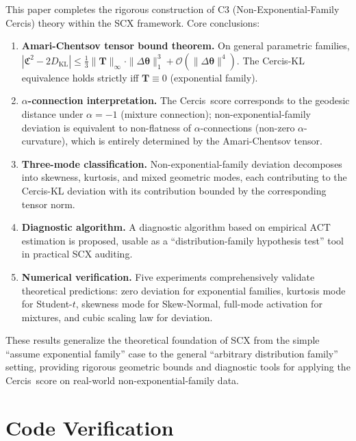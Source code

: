 \documentclass[12pt,a4paper]{article}
\theoremstyle{plain}
\theoremstyle{definition}
\theoremstyle{remark}
\newcommand{\SCX}{\textsf{SCX}}
\newcommand{\Cercis}{\textsf{Cercis}}
\newcommand{\DKL}{D_{\mathrm{KL}}}
\newcommand{\CercisScore}{\mathfrak{C}}
\newcommand{\ACT}{\mathbf{T}}    %
\begin{document}
This paper completes the rigorous construction of C3 (Non-Exponential-Family \Cercis) theory within the \SCX{} framework. Core conclusions:

\begin{enumerate}[label=(\arabic*), leftmargin=*]
    \item \textbf{Amari-Chentsov tensor bound theorem.} On general parametric families, $|\CercisScore^2 - 2\DKL| \leq \frac{1}{3}\|\ACT\|_{\infty} \cdot \|\Delta\bm{\theta}\|_1^3 + \mathcal{O}(\|\Delta\bm{\theta}\|^4)$. The \Cercis-KL equivalence holds strictly iff $\ACT \equiv 0$ (exponential family).
    \item \textbf{$\alpha$-connection interpretation.} The \Cercis\ score corresponds to the geodesic distance under $\alpha = -1$ (mixture connection); non-exponential-family deviation is equivalent to non-flatness of $\alpha$-connections (non-zero $\alpha$-curvature), which is entirely determined by the Amari-Chentsov tensor.
    \item \textbf{Three-mode classification.} Non-exponential-family deviation decomposes into skewness, kurtosis, and mixed geometric modes, each contributing to the \Cercis-KL deviation with its contribution bounded by the corresponding tensor norm.
    \item \textbf{Diagnostic algorithm.} A diagnostic algorithm based on empirical ACT estimation is proposed, usable as a ``distribution-family hypothesis test'' tool in practical \SCX{} auditing.
    \item \textbf{Numerical verification.} Five experiments comprehensively validate theoretical predictions: zero deviation for exponential families, kurtosis mode for Student-$t$, skewness mode for Skew-Normal, full-mode activation for mixtures, and cubic scaling law for deviation.
\end{enumerate}

These results generalize the theoretical foundation of \SCX{} from the simple ``assume exponential family'' case to the general ``arbitrary distribution family'' setting, providing rigorous geometric bounds and diagnostic tools for applying the \Cercis\ score on real-world non-exponential-family data.

\appendix

\section{Code Verification}
\label{sec:code_verify}
\end{document}
